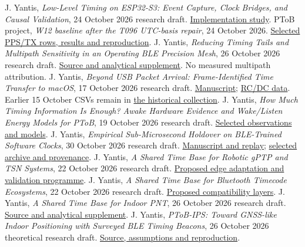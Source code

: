 \documentclass[11pt,letterpaper]{article}
\newcommand{\repo}[2]{\href{https://github.com/yantisj2/PToB/blob/a3c96db35b1817de534abe4450cfd032ceca77e8/#1}{#2}}
\begin{document}
\begin{thebibliography}{99}
 J. Yantis, \emph{Low-Level Timing on ESP32-S3: Event Capture, Clock Bridges, and Causal Validation}, 24 October 2026 research draft. \repo{papers/ptob-esp32s3-low-level-timing.tex}{Implementation study}.
 PToB project, \emph{W12 baseline after the T096 UTC-basis repair}, 24 October 2026. \repo{evidence/s3/2026-10-24-w12-utc-basis/README.md}{Selected PPS/TX rows, results and reproduction}.
 J. Yantis, \emph{Reducing Timing Tails and Multipath Sensitivity in an Operating BLE Precision Mesh}, 26 October 2026 research draft. \repo{papers/ble-tail-multipath/README.md}{Source and analytical supplement}. No measured multipath attribution.
 J. Yantis, \emph{Beyond USB Packet Arrival: Frame-Identified Time Transfer to macOS}, 17 October 2026 research draft. \repo{papers/usb-macos-time-transfer-preprint.tex}{Manuscript}; \repo{evidence/usb/2026-10-17/README.md}{RC/DC data}. Earlier 15 October CSVs remain in \repo{evidence/research/2026-10-16/README.md}{the historical collection}.
 J. Yantis, \emph{How Much Timing Information Is Enough? Awake Hardware Evidence and Wake/Listen Energy Models for PToB}, 19 October 2026 research draft. \repo{evidence/power/2026-10-19/README.md}{Selected observations and models}.
 J. Yantis, \emph{Empirical Sub-Microsecond Holdover on BLE-Trained Software Clocks}, 30 October 2026 research draft. \repo{papers/mcxo-holdover-duration/README.md}{Manuscript and replay}; \repo{evidence/w12/2026-10-30-holdover/README.md}{selected archive and provenance}.
 J. Yantis, \emph{A Shared Time Base for Robotic gPTP and TSN Systems}, 22 October 2026 research draft. \repo{papers/ptob-gptp-tsn-robotics-preprint.tex}{Proposed edge adaptation and validation programme}.
 J. Yantis, \emph{A Shared Time Base for Bluetooth Timecode Ecosystems}, 22 October 2026 research draft. \repo{papers/ptob-bluetooth-timecode-preprint.tex}{Proposed compatibility layers}.
 J. Yantis, \emph{A Shared Time Base for Indoor PNT}, 26 October 2026 research draft. \repo{papers/indoor-pnt/README.md}{Source and analytical supplement}.
 J. Yantis, \emph{PToB-IPS: Toward GNSS-like Indoor Positioning with Surveyed BLE Timing Beacons}, 26 October 2026 theoretical research draft. \repo{papers/indoor-ips/README.md}{Source, assumptions and reproduction}.
\end{thebibliography}
\end{document}

